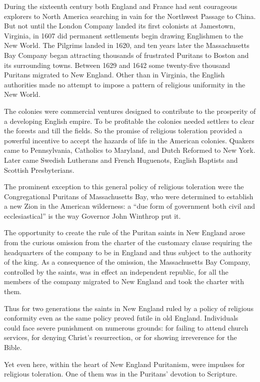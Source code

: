 During the sixteenth century both England and France had sent courageous explorers to North America
searching in vain for the Northwest Passage to China. But not until the London Company landed its
first colonists at Jamestown, Virginia, in 1607 did permanent settlements begin drawing Englishmen
to the New World. The Pilgrims landed in 1620, and ten years later the Massachusetts Bay Company
began attracting thousands of frustrated Puritans to Boston and its surrounding towns. Between 1629
and 1642 some twenty-five thousand Puritans migrated to New England. Other than in Virginia, the
English authorities made no attempt to impose a pattern of religious uniformity in the New World.

The colonies were commercial ventures designed to contribute to the prosperity of a developing
English empire. To be profitable the colonies needed settlers to clear the forests and till the
fields. So the promise of religious toleration provided a powerful incentive to accept the hazards
of life in the American colonies. Quakers came to Pennsylvania, Catholics to Maryland, and Dutch
Reformed to New York. Later came Swedish Lutherans and French Huguenots, English Baptists and
Scottish Presbyterians.

The prominent exception to this general policy of religious toleration were the Congregational
Puritans of Massachusetts Bay, who were determined to establish a new Zion in the American
wilderness: a “due form of government both civil and ecclesiastical” is the way Governor John
Winthrop put it.

The opportunity to create the rule of the Puritan saints in New England arose from the curious
omission from the charter of the customary clause requiring the headquarters of the company to be in
England and thus subject to the authority of the king. As a consequence of the omission, the
Massachusetts Bay Company, controlled by the saints, was in effect an independent republic, for all
the members of the company migrated to New England and took the charter with them.

Thus for two generations the saints in New England ruled by a policy of religious conformity even as
the same policy proved futile in old England. Individuals could face severe punishment on numerous
grounds: for failing to attend church services, for denying Christ’s resurrection, or for showing
irreverence for the Bible.

Yet even here, within the heart of New England Puritanism, were impulses for religious toleration.
One of them was in the Puritans’ devotion to Scripture.

